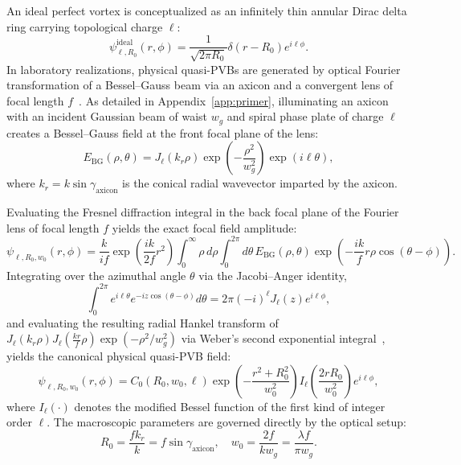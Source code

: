 \documentclass{optica-article}
\begin{document}
An ideal perfect vortex is conceptualized as an infinitely thin annular Dirac delta ring carrying topological charge $\ell$:
\begin{equation}
\psi_{\ell, R_0}^{\text{ideal}}(r, \phi) = \frac{1}{\sqrt{2\pi R_0}} \delta(r - R_0) e^{i \ell \phi}.
\label{eq:ideal_pvb}
\end{equation}
In laboratory realizations, physical quasi-PVBs are generated by optical Fourier transformation of a Bessel--Gauss beam via an axicon and a convergent lens of focal length $f$~\cite{Vaity2015}. As detailed in Appendix~\ref{app:primer}, illuminating an axicon with an incident Gaussian beam of waist $w_g$ and spiral phase plate of charge $\ell$ creates a Bessel--Gauss field at the front focal plane of the lens:
\begin{equation}
E_{\text{BG}}(\rho, \theta) = J_\ell(k_r \rho) \exp\left( -\frac{\rho^2}{w_g^2} \right) \exp(i \ell \theta),
\label{eq:bg_field}
\end{equation}
where $k_r = k \sin \gamma_{\text{axicon}}$ is the conical radial wavevector imparted by the axicon.

Evaluating the Fresnel diffraction integral in the back focal plane of the Fourier lens of focal length $f$ yields the exact focal field amplitude:
\begin{equation}
\psi_{\ell, R_0, w_0}(r, \phi) = \frac{k}{i f} \exp\left( \frac{i k}{2f} r^2 \right) \int_0^\infty \rho \, d\rho \int_0^{2\pi} d\theta \, E_{\text{BG}}(\rho, \theta) \exp\left( - \frac{i k}{f} r \rho \cos(\theta - \phi) \right).
\label{eq:fresnel_integral_focal}
\end{equation}
Integrating over the azimuthal angle $\theta$ via the Jacobi--Anger identity,
\begin{equation}
\int_0^{2\pi} e^{i \ell \theta} e^{-i z \cos(\theta - \phi)} d\theta = 2\pi (-i)^\ell J_\ell(z) e^{i \ell \phi},
\label{eq:bessel_generating_integral}
\end{equation}
and evaluating the resulting radial Hankel transform of $J_\ell(k_r \rho) J_\ell(\frac{k r}{f} \rho) \exp(-\rho^2 / w_g^2)$ via Weber's second exponential integral~\cite{Gradshteyn2014}, yields the canonical physical quasi-PVB field:
\begin{equation}
\psi_{\ell, R_0, w_0}(r, \phi) = C_0(R_0, w_0, \ell) \exp\left( - \frac{r^2 + R_0^2}{w_0^2} \right) I_\ell\left( \frac{2 r R_0}{w_0^2} \right) e^{i \ell \phi},
\label{eq:pvb_field}
\end{equation}
where $I_\ell(\cdot)$ denotes the modified Bessel function of the first kind of integer order $\ell$. The macroscopic parameters are governed directly by the optical setup:
\begin{equation}
R_0 = \frac{f k_r}{k} = f \sin \gamma_{\text{axicon}}, \quad w_0 = \frac{2 f}{k w_g} = \frac{\lambda f}{\pi w_g}.
\label{eq:r0_w0_parameters}
\end{equation}
\end{document}

